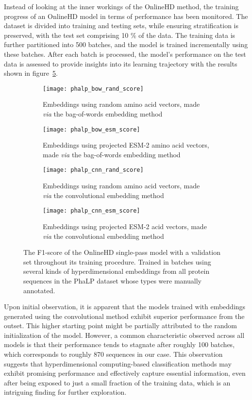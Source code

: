 Instead of looking at the inner workings of the OnlineHD method, the training progress of an OnlineHD model in terms of performance has been monitored. The dataset is divided into training and testing sets, while ensuring stratification is preserved, with the test set comprising 10 \% of the data. The training data is further partitioned into 500 batches, and the model is trained incrementally using these batches. After each batch is processed, the model's performance on the test data is assessed to provide insights into its learning trajectory with the results shown in figure~\ref{fig:main39}.

\begin{figure}[h!]
    \centering
    \begin{subfigure}{0.48\textwidth}
        \texttt{[image: phalp\_bow\_rand\_score]}
        \caption{Embeddings using random amino acid vectors, made \textit{via} the bag-of-words embedding method}
        \label{fig:subfig-a3}
    \end{subfigure}
    \hfill
    \begin{subfigure}{0.48\textwidth}
        \texttt{[image: phalp\_bow\_esm\_score]}
        \caption{Embeddings using projected ESM-2 amino acid vectors, made \textit{via} the bag-of-words embedding method}
        \label{fig:subfig-b3}
    \end{subfigure}
    
    \begin{subfigure}{0.48\textwidth}
        \texttt{[image: phalp\_cnn\_rand\_score]}
        \caption{Embeddings using random amino acid vectors, made \textit{via} the convolutional embedding method}
        \label{fig:subfig-c3}
    \end{subfigure}
    \hfill
    \begin{subfigure}{0.48\textwidth}
        \texttt{[image: phalp\_cnn\_esm\_score]}
        \caption{Embeddings using projected ESM-2 acid vectors, made \textit{via} the convolutional embedding method}
        \label{fig:subfig-d3}
    \end{subfigure}
    \caption{The F1-score of the OnlineHD single-pass model with a validation set throughout its training procedure. Trained in batches using several kinds of hyperdimensional embeddings from all protein sequences in the PhaLP dataset whose types were manually annotated.}
    \label{fig:main39}
\end{figure}

Upon initial observation, it is apparent that the models trained with embeddings generated using the convolutional method exhibit superior performance from the outset. This higher starting point might be partially attributed to the random initialization of the model. However, a common characteristic observed across all models is that their performance tends to stagnate after roughly 100 batches, which corresponds to roughly 870 sequences in our case. This observation suggests that hyperdimensional computing-based classification methods may exhibit promising performance and effectively capture essential information, even after being exposed to just a small fraction of the training data, which is an intriguing finding for further exploration.


